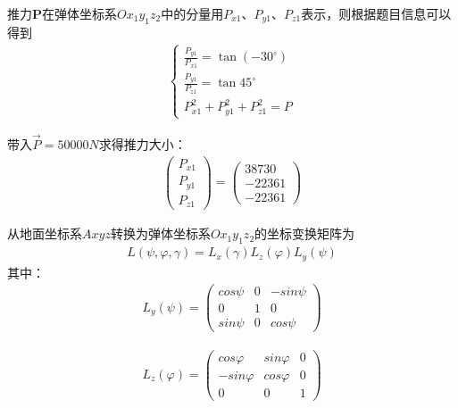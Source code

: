 \documentclass[UTF8]{ctexart}
\begin{document}
推力{\bf{P}}在弹体坐标系$Ox_{1}y_{1}z_{2}$中的分量用$P_{x1}$、$P_{y1}$、$P_{z1}$表示，则根据题目信息可以得到
\begin{align}
    \begin{cases}
        \frac{P_{y1}}{P_{x1}}=\tan{\left( - 30^\circ\right)} \\
        \frac{P_{y1}}{P_{z1}}=\tan{45^\circ}
        \\
        P_{x1}^2 + P_{y1}^2 + P_{z1}^2 = P
    \end{cases}
\end{align}

带入$\vec{P}=50000N$求得推力大小：
\begin{align}
    \begin{pmatrix}
        P_{x1} \\
        P_{y1} \\
        P_{z1}
    \end{pmatrix}
    =
    \begin{pmatrix}
        38730  \\
        -22361 \\
        -22361
    \end{pmatrix}
\end{align}


从地面坐标系$Axyz$转换为弹体坐标系$Ox_{1}y_{1}z_{2}$的坐标变换矩阵为
\begin{align}
    L \left(\psi , \varphi , \gamma\right)
    =
    L_{x} \left(\gamma\right)
    L_{z} \left(\varphi\right)
    L_{y} \left(\psi\right)
\end{align}
其中：
\begin{align}
    L_{y} \left(\psi\right)
    =
    \begin{pmatrix}
        cos\psi & 0 & -sin\psi
        \\
        0       & 1 & 0
        \\
        sin\psi & 0 & cos\psi
    \end{pmatrix}
\end{align}

\begin{align}
    L_{z} \left(\varphi \right)
    =
    \begin{pmatrix}
        cos\varphi  & sin\varphi & 0
        \\
        -sin\varphi & cos\varphi & 0
        \\
        0           & 0          & 1
    \end{pmatrix}
\end{align}
\end{document}
